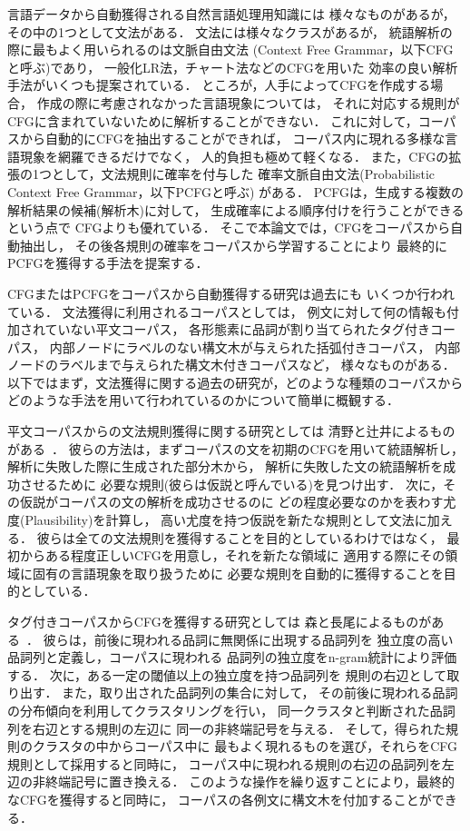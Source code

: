 言語データから自動獲得される自然言語処理用知識には
様々なものがあるが，その中の1つとして文法がある．
文法には様々なクラスがあるが，
統語解析の際に最もよく用いられるのは文脈自由文法
(Context Free Grammar，以下CFGと呼ぶ)であり，
一般化LR法，チャート法などのCFGを用いた
効率の良い解析手法がいくつも提案されている．
ところが，人手によってCFGを作成する場合，
作成の際に考慮されなかった言語現象については，
それに対応する規則がCFGに含まれていないために解析することができない．
これに対して，コーパスから自動的にCFGを抽出することができれば，
コーパス内に現れる多様な言語現象を網羅できるだけでなく，
人的負担も極めて軽くなる．
また，CFGの拡張の1つとして，文法規則に確率を付与した
確率文脈自由文法(Probabilistic Context Free Grammar，以下PCFGと呼ぶ)
がある\cite{wetherell80a}．
PCFGは，生成する複数の解析結果の候補(解析木)に対して，
生成確率による順序付けを行うことができるという点で
CFGよりも優れている．
そこで本論文では，CFGをコーパスから自動抽出し，
その後各規則の確率をコーパスから学習することにより
最終的にPCFGを獲得する手法を提案する．

CFGまたはPCFGをコーパスから自動獲得する研究は過去にも
いくつか行われている．
文法獲得に利用されるコーパスとしては，
例文に対して何の情報も付加されていない平文コーパス，
各形態素に品詞が割り当てられたタグ付きコーパス，
内部ノードにラベルのない構文木が与えられた括弧付きコーパス，
内部ノードのラベルまで与えられた構文木付きコーパスなど，
様々なものがある．
以下ではまず，文法獲得に関する過去の研究が，どのような種類のコーパスから
どのような手法を用いて行われているのかについて簡単に概観する．

平文コーパスからの文法規則獲得に関する研究としては
清野と辻井によるものがある~\cite{kiyono93a,kiyono94a,kiyono94b}．
彼らの方法は，まずコーパスの文を初期のCFGを用いて統語解析し，
解析に失敗した際に生成された部分木から，
解析に失敗した文の統語解析を成功させるために
必要な規則(彼らは仮説と呼んでいる)を見つけ出す．
次に，その仮説がコーパスの文の解析を成功させるのに
どの程度必要なのかを表わす尤度(Plausibility)を計算し，
高い尤度を持つ仮説を新たな規則として文法に加える．
彼らは全ての文法規則を獲得することを目的としているわけではなく，
最初からある程度正しいCFGを用意し，それを新たな領域に
適用する際にその領域に固有の言語現象を取り扱うために
必要な規則を自動的に獲得することを目的としている．

タグ付きコーパスからCFGを獲得する研究としては
森と長尾によるものがある~\cite{mori95a}．
彼らは，前後に現われる品詞に無関係に出現する品詞列を
独立度の高い品詞列と定義し，コーパスに現われる
品詞列の独立度をn-gram統計により評価する．
次に，ある一定の閾値以上の独立度を持つ品詞列を
規則の右辺として取り出す．
また，取り出された品詞列の集合に対して，
その前後に現われる品詞の分布傾向を利用してクラスタリングを行い，
同一クラスタと判断された品詞列を右辺とする規則の左辺に
同一の非終端記号を与える．
そして，得られた規則のクラスタの中からコーパス中に
最もよく現れるものを選び，それらをCFG規則として採用すると同時に，
コーパス中に現われる規則の右辺の品詞列を左辺の非終端記号に置き換える．
このような操作を繰り返すことにより，最終的なCFGを獲得すると同時に，
コーパスの各例文に構文木を付加することができる．


